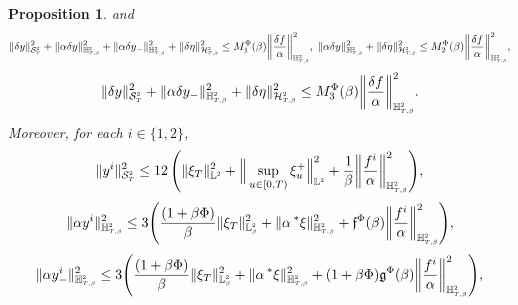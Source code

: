 \documentclass[10pt]{article} %
\newtheorem{proposition}[theorem]{Proposition}
\newcommand\cH{\mathcal H}
\newcommand\cS{\mathcal S}
\newcommand{\smalltext}[1]{\text{\fontsize{4}{4}\selectfont$#1$}}
\newcommand\ff{\mathfrak f}
\newcommand\fg{\mathfrak g}
\def \H{\mathbb{H}}
\def \L{\mathbb{L}}
\newcommand{\brs}[1]{\prescript{\ast}{}{#1}}
\newcommand{\1}{\mathbf{1}}
\begin{document}
\begin{proposition}
	and
	\begin{equation*}
		\|\delta y\|^2_{\cS^\smalltext{2}_\smalltext{T}} + \|\alpha \delta y\|^2_{\H^{\smalltext{2}}_{\smalltext{T}\smalltext{,}\smalltext{\beta}}} + \|\alpha \delta y_-\|^2_{\H^\smalltext{2}_{\smalltext{T}\smalltext{,}\smalltext{\beta}}} + \|\delta\eta\|^2_{\cH^{\smalltext{2}}_{\smalltext{T}\smalltext{,}\smalltext{\beta}}} 
		\leq M^\Phi_1(\beta) \bigg\| \frac{\delta f}{\alpha} \bigg\|^2_{\H^{\smalltext{2}}_{\smalltext{T}\smalltext{,}\smalltext{\beta}}},
		\;
		\|\alpha \delta y\|^2_{\H^{\smalltext{2}}_{\smalltext{T}\smalltext{,}\smalltext{\beta}}} + \|\delta\eta\|^2_{\cH^{\smalltext{2}}_{\smalltext{T}\smalltext{,}\smalltext{\beta}}} 
		\leq M^\Phi_2(\beta) \bigg\| \frac{\delta f}{\alpha} \bigg\|^2_{\H^{\smalltext{2}}_{\smalltext{T}\smalltext{,}\smalltext{\beta}}},
	\end{equation*}
	\begin{equation*}
		\|\delta y\|^2_{\cS^\smalltext{2}_\smalltext{T}} + \|\alpha \delta y_-\|^2_{\H^\smalltext{2}_{\smalltext{T}\smalltext{,}\smalltext{\beta}}} + \|\delta\eta\|^2_{\cH^{\smalltext{2}}_{\smalltext{T}\smalltext{,}\smalltext{\beta}}} 
		\leq M^\Phi_3(\beta) \bigg\| \frac{\delta f}{\alpha} \bigg\|^2_{\H^{\smalltext{2}}_{\smalltext{T}\smalltext{,}\smalltext{\beta}}}.
	\end{equation*}
	Moreover, for each $i \in \{1,2\}$,
	\begin{equation*}
		\|y^i\|^2_{\cS^\smalltext{2}_\smalltext{T}} \leq 12 \, \Bigg(\|\xi_T\|^2_{\L^\smalltext{2}} + \Big\|\sup_{u \in [0,T)} \xi^+_u\Big\|^2_{\L^\smalltext{2}} +  \frac{1}{\beta}\bigg\|\frac{f^i}{\alpha}\bigg\|^2_{\H^\smalltext{2}_{\smalltext{T}\smalltext{,}\smalltext{\beta}}}\Bigg),
	\end{equation*}
	\begin{equation*}
		\|\alpha y^i\|_{\mathbb{H}^{\smalltext{2}}_{\smalltext{T}\smalltext{,}\smalltext{\beta}}}^2 
		\leq 3 \Bigg( \frac{(1+\beta\Phi)}{\beta} \|\xi_T\|^2_{\L^\smalltext{2}_\smalltext{\beta}} + \|\alpha\brs{\xi}\|^2_{\H^\smalltext{2}_{\smalltext{T}\smalltext{,}\smalltext{\beta}}} +  \ff^\Phi(\beta) \bigg\| \frac{f^i}{\alpha} \bigg\|^2_{\H^{\smalltext{2}}_{\smalltext{T}\smalltext{,}\smalltext{\beta}}} \Bigg),
	\end{equation*}
	\begin{equation*}
		\|\alpha y^i_-\|^2_{\H^\smalltext{2}_{\smalltext{T}\smalltext{,}\smalltext{\beta}}} 
		\leq 3 \Bigg( \frac{(1+\beta\Phi)}{\beta} \|\xi_T\|^2_{\L^\smalltext{2}_\smalltext{\beta}} + \|\alpha\brs{\xi}\|^2_{\H^\smalltext{2}_{\smalltext{T}\smalltext{,}\smalltext{\beta}}} +  (1+\beta\Phi) \fg^\Phi(\beta) \bigg\| \frac{f^i}{\alpha} \bigg\|^2_{\H^{\smalltext{2}}_{\smalltext{T}\smalltext{,}\smalltext{\beta}}} \Bigg),

\end{equation*}
\end{proposition}
\end{document}
